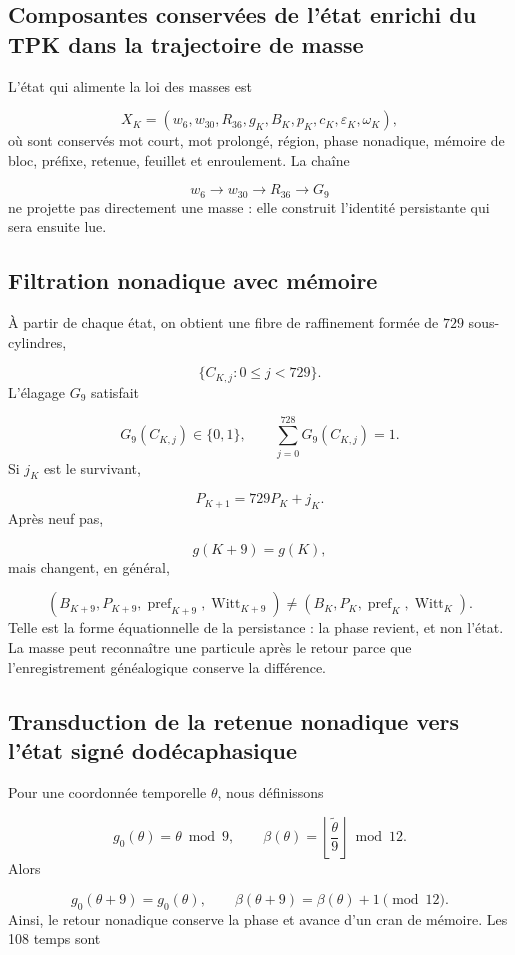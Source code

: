\subsection{Composantes conservées de l'état enrichi du TPK dans la trajectoire de masse}
L'état qui alimente la loi des masses est

\[
 X_K=(w_6,w_{30},R_{36},g_K,B_K,p_K,c_K,\varepsilon_K,\omega_K),
\]
où sont conservés mot court, mot prolongé, région, phase nonadique, mémoire de bloc, préfixe, retenue, feuillet et enroulement. La chaîne

\[
 w_6\longrightarrow w_{30}\longrightarrow R_{36}
 \longrightarrow G_9
\]
ne projette pas directement une masse : elle construit l'identité persistante qui sera ensuite lue.

\subsection{Filtration nonadique avec mémoire}
À partir de chaque état, on obtient une fibre de raffinement formée de \(729\) sous-cylindres,

\[
 \{C_{K,j}:0\le j<729\}.
\]
L'élagage \(G_9\) satisfait

\[
 G_9(C_{K,j})\in\{0,1\},\qquad
 \sum_{j=0}^{728}G_9(C_{K,j})=1.
\]
Si \(j_K\) est le survivant,

\[
 P_{K+1}=729P_K+j_K.
\]
Après neuf pas,

\[
 g(K+9)=g(K),
\]
mais changent, en général,

\[
 (B_{K+9},P_{K+9},\operatorname{pref}_{K+9},
 \operatorname{Witt}_{K+9})
 \ne
 (B_K,P_K,\operatorname{pref}_K,\operatorname{Witt}_K).
\]
Telle est la forme équationnelle de la persistance : la phase revient, et non l'état. La masse peut reconnaître une particule après le retour parce que l'enregistrement généalogique conserve la différence.

\subsection{Transduction de la retenue nonadique vers l'état signé dodécaphasique}
Pour une coordonnée temporelle \(\theta\), nous définissons

\[
 g_0(\theta)=\theta\bmod9,\qquad
 \beta(\theta)=
 \left\lfloor\frac{\widetilde\theta}{9}\right\rfloor\bmod12.
\]
Alors

\[
 g_0(\theta+9)=g_0(\theta),\qquad
 \beta(\theta+9)=\beta(\theta)+1\pmod{12}.
\]
Ainsi, le retour nonadique conserve la phase et avance d'un cran de mémoire. Les 108 temps sont

